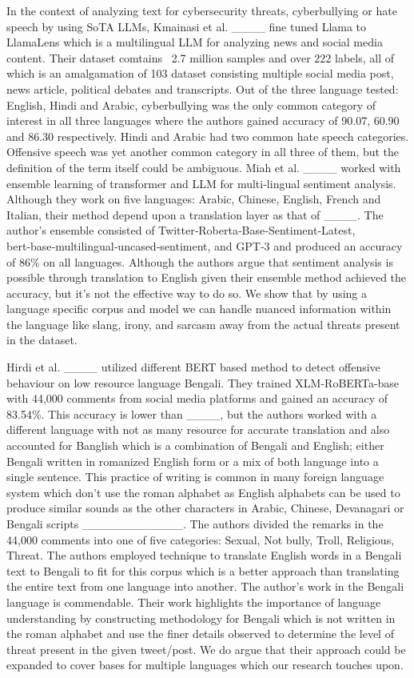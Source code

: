 In the context of analyzing text for cybersecurity threats, cyberbullying or hate speech by using SoTA LLMs, Kmainasi et al. ____ fine tuned Llama to LlamaLens which is a multilingual LLM for analyzing news and social media content. Their dataset comtains ~2.7 million samples and over 222 labels, all of which is an amalgamation of 103 dataset consisting multiple social media post, news article, political debates and transcripts. Out of the three language tested: English, Hindi and Arabic, cyberbullying was the only common category of interest in all three languages where the authors gained accuracy of 90.07, 60.90 and 86.30 respectively. Hindi and Arabic had two common hate speech categories. Offensive speech was yet another common category in all three of them, but the definition of the term itself could be ambiguous.  Miah et al. ____ worked with ensemble learning of transformer and LLM for multi-lingual sentiment analysis. Although they work on five languages: Arabic, Chinese, English, French and Italian, their method depend upon a translation layer as that of ____. The author's ensemble consisted of Twitter‑Roberta‑Base‑Sentiment‑Latest, bert‑base‑multilingual‑uncased‑sentiment, and GPT‑3 and produced an accuracy of 86\% on all languages. Although the authors argue that sentiment analysis is possible through translation to English given their ensemble method achieved the accuracy, but it's not the effective way to do so. We show that by using a language specific corpus and model we can handle nuanced information within the language like slang, irony, and sarcasm away from the actual threats present in the dataset.


Hirdi et al. ____ utilized different BERT based method to detect offensive behaviour on low resource language Bengali. They trained XLM-RoBERTa-base with 44,000 comments from social media platforms and gained an accuracy of 83.54\%. This accuracy is lower than ____, but the authors worked with a different language with not as many resource for accurate translation and also accounted for Banglish which is a combination of Bengali and English; either Bengali written in romanized English form or a mix of both language into a single sentence. This practice of writing is common in many foreign language system which don't use the roman alphabet as English alphabets can be used to produce similar sounds as the other characters in Arabic, Chinese, Devanagari or Bengali scripts ____________. The authors divided the remarks in the 44,000 comments into one of five categories: Sexual, Not bully, Troll, Religious, Threat. The authors employed technique to translate English words in a Bengali text to Bengali to fit for this corpus which is a better approach than translating the entire text from one language into another. The author's work in the Bengali language is commendable. Their work highlights the importance of language understanding by constructing methodology for Bengali which is not written in the roman alphabet and use the finer details observed to determine the level of threat present in the given tweet/post. We do argue that their approach could be expanded to cover bases for multiple languages which our research touches upon. 


